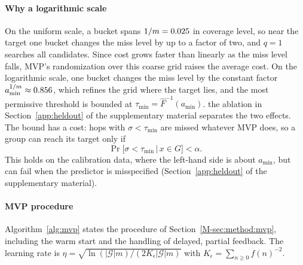 \paragraph*{Why a logarithmic scale}
On the uniform scale, a bucket spans $1/m=0.025$ in coverage level, so near the
target one bucket changes the miss level by up to a factor of two, and $q=1$
searches all candidates. Since cost grows faster than linearly as the miss level
falls, MVP's randomization over this coarse grid raises the average cost. On the
logarithmic scale, one bucket changes the miss level by the constant factor
$a_{\min}^{1/m}\approx0.856$, which refines the grid where the target lies,
and the most permissive threshold is bounded at
$\tau_{\min}=\hat{F}^{-1}(a_{\min})$. the ablation in Section~\ref{app:heldout} of the supplementary material separates the
two effects. The bound has a cost: hops with $\sigma<\tau_{\min}$ are missed
whatever MVP does, so a group can reach its target only if
\begin{equation}
  \Pr\bigl[\sigma<\tau_{\min}\,\big|\,x\in G\bigr] < \alpha .
  \label{eq:feasible}
\end{equation}
This holds on the calibration data, where the left-hand side is about $a_{\min}$,
but can fail when the predictor is misspecified (Section~\ref{app:heldout} of the supplementary material).


\paragraph*{MVP procedure}
Algorithm~\ref{alg:mvp} states the procedure of Section~\ref{M-sec:method:mvp},
including the warm start and the handling of delayed, partial feedback. The
learning rate is $\eta=\sqrt{\ln(|\mathcal{G}|m)/(2K_\epsilon|\mathcal{G}|m)}$ with
$K_\epsilon=\sum_{n\ge 0}f(n)^{-2}$.

